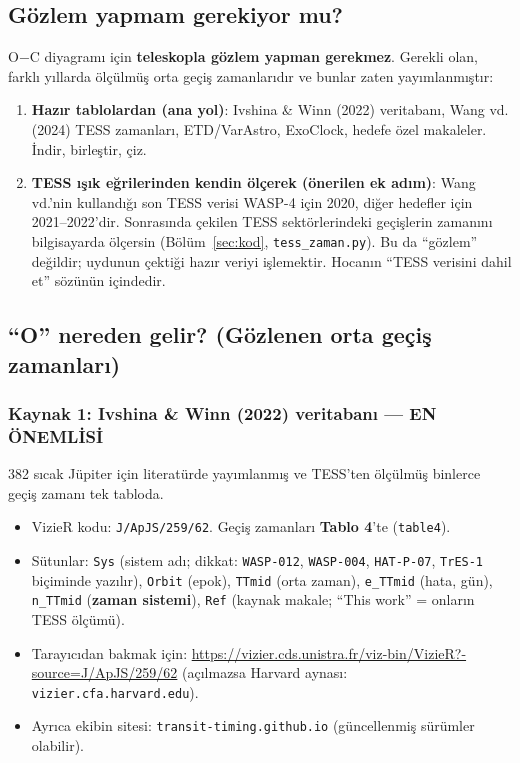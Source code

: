 \subsection{Gözlem yapmam gerekiyor mu?}
\begin{basit}
O$-$C diyagramı için \textbf{teleskopla gözlem yapman gerekmez}. Gerekli olan, farklı yıllarda ölçülmüş
orta geçiş zamanlarıdır ve bunlar zaten yayımlanmıştır:
\begin{enumerate}[leftmargin=*]
\item \textbf{Hazır tablolardan (ana yol)}: Ivshina \& Winn (2022) veritabanı, Wang vd. (2024) TESS zamanları,
      ETD/VarAstro, ExoClock, hedefe özel makaleler. İndir, birleştir, çiz.
\item \textbf{TESS ışık eğrilerinden kendin ölçerek (önerilen ek adım)}: Wang vd.'nin kullandığı son TESS verisi
      WASP-4 için 2020, diğer hedefler için 2021–2022'dir. Sonrasında çekilen TESS sektörlerindeki geçişlerin
      zamanını bilgisayarda ölçersin (Bölüm~\ref{sec:kod}, \texttt{tess\_zaman.py}). Bu da “gözlem” değildir;
      uydunun çektiği hazır veriyi işlemektir. Hocanın “TESS verisini dahil et” sözünün içindedir.
\end{enumerate}
\end{basit}

\subsection{“O” nereden gelir? (Gözlenen orta geçiş zamanları)}

\subsubsection*{Kaynak 1: Ivshina \& Winn (2022) veritabanı — EN ÖNEMLİSİ}
382 sıcak Jüpiter için literatürde yayımlanmış ve TESS'ten ölçülmüş binlerce geçiş zamanı tek tabloda.
\begin{itemize}[leftmargin=*]
\item VizieR kodu: \texttt{J/ApJS/259/62}. Geçiş zamanları \textbf{Tablo 4}'te (\texttt{table4}).
\item Sütunlar: \texttt{Sys} (sistem adı; dikkat: \texttt{WASP-012}, \texttt{WASP-004}, \texttt{HAT-P-07},
      \texttt{TrES-1} biçiminde yazılır), \texttt{Orbit} (epok), \texttt{TTmid} (orta zaman), \texttt{e\_TTmid}
      (hata, gün), \texttt{n\_TTmid} (\textbf{zaman sistemi}), \texttt{Ref} (kaynak makale; “This work” = onların TESS ölçümü).
\item Tarayıcıdan bakmak için: \url{https://vizier.cds.unistra.fr/viz-bin/VizieR?-source=J/ApJS/259/62}
      (açılmazsa Harvard aynası: \texttt{vizier.cfa.harvard.edu}).
\item Ayrıca ekibin sitesi: \texttt{transit-timing.github.io} (güncellenmiş sürümler olabilir).
\end{itemize}

